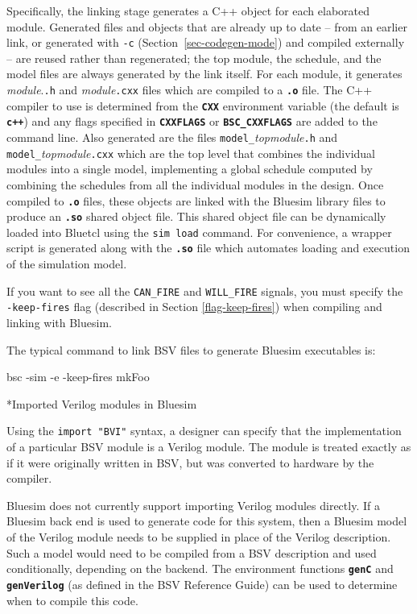 \documentclass{article}
\makeatletter
\newcommand{\te}[1]{\texttt{#1}}
\newenvironment{centerboxverbatim}
  {\center
   \boxedverbatim}
  {\endboxedverbatim
  {\endcenter }}
\def\subsubsubsection{\@startsection {subsubsubsection}{4}{\z@}{-3ex plus -1ex minus -.2ex}{1.25ex plus .2ex}{\normalsize\bf}*}
\makeatother
\begin{document}
Specifically, the linking stage generates a C++ object for each
elaborated module.  Generated files and objects that are already up to
date -- from an earlier link, or generated with \te{-c}
(Section~\ref{sec-codegen-mode}) and compiled externally -- are reused
rather than regenerated; the top module, the schedule, and the model
files are always generated by the link itself.  For each module, it generates {\em module}.\te{.h} and
{\em module}\te{.cxx} files which are compiled to a {\bf\tt .o} file.
The C++ compiler to use is determined from the {\bf\tt CXX}
environment variable (the default is {\bf\tt c++}) and any flags
specified in {\bf\tt CXXFLAGS} or {\bf\tt BSC\_CXXFLAGS} are added to
the command line.
Also generated are the files \te{model\_}{\em topmodule}\te{.h} and
\te{model\_}{\em topmodule}\te{.cxx} which are the top level that combines
the individual modules into a single model,
implementing a global schedule computed by combining the schedules from
all the individual modules in the design.
Once compiled to {\bf\tt .o} files, these objects are linked with
the Bluesim library files to produce an {\bf\tt .so} shared object
file.  This shared object file can be dynamically loaded into Bluetcl
using the {\tt sim load} command.  For convenience, a wrapper script
is generated along with the {\bf\tt .so} file which automates loading
and execution of the simulation model.

If you want to see all the \te{CAN\_FIRE} and \te{WILL\_FIRE} signals,
you must specify the \te{-keep-fires} flag (described in Section
\ref{flag-keep-fires})  when compiling and linking
with Bluesim.

The typical command to link  BSV files to generate    Bluesim
executables is:

\begin{centerboxverbatim}
bsc -sim -e -keep-fires mkFoo
\end{centerboxverbatim}


\subsubsubsection{Imported Verilog modules in Bluesim}
\label{importV-bluesim}

Using the \te{import "BVI"} syntax, a designer can specify that the
implementation of a particular BSV module is a Verilog module.  The
module is treated exactly as if it were originally written in BSV, but
was converted to hardware by the compiler.

Bluesim does not currently support importing Verilog modules
directly.  If a Bluesim back end is used to generate code for this
system,  then a
Bluesim model of the Verilog module  needs to be supplied in place
of the Verilog description.  Such a model would need to be compiled from a
BSV description and used conditionally, depending on the backend.  The
 environment
functions {\bf\tt genC} and {\bf\tt genVerilog} (as defined in the BSV
Reference Guide) can be used to determine when to compile this code.
\end{document}
